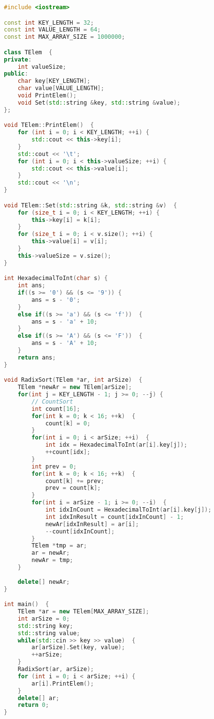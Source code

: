 \begin{lstlisting}[language=C++]
#include <iostream>

const int KEY_LENGTH = 32;
const int VALUE_LENGTH = 64;
const int MAX_ARRAY_SIZE = 1000000;

class TElem  {
private:
    int valueSize;
public:
    char key[KEY_LENGTH];
    char value[VALUE_LENGTH];
    void PrintElem();
    void Set(std::string &key, std::string &value);
};

void TElem::PrintElem()  {
    for (int i = 0; i < KEY_LENGTH; ++i) {
        std::cout << this->key[i];
    } 
    std::cout << '\t';
    for (int i = 0; i < this->valueSize; ++i) {
        std::cout << this->value[i];
    }
    std::cout << '\n';
}

void TElem::Set(std::string &k, std::string &v)  {
    for (size_t i = 0; i < KEY_LENGTH; ++i) {
        this->key[i] = k[i];
    }
    for (size_t i = 0; i < v.size(); ++i) {
        this->value[i] = v[i];
    }
    this->valueSize = v.size();
}

int HexadecimalToInt(char s) {
    int ans;
    if((s >= '0') && (s <= '9')) {
        ans = s - '0';
    }
    else if((s >= 'a') && (s <= 'f'))  {
        ans = s - 'a' + 10;
    }
    else if((s >= 'A') && (s <= 'F'))  {
        ans = s - 'A' + 10;
    }
    return ans;
}

void RadixSort(TElem *ar, int arSize)  {
    TElem *newAr = new TElem[arSize];
    for(int j = KEY_LENGTH - 1; j >= 0; --j) {
        // CountSort
        int count[16];
        for(int k = 0; k < 16; ++k)  {
            count[k] = 0;
        }
        for(int i = 0; i < arSize; ++i)  {
            int idx = HexadecimalToInt(ar[i].key[j]);
            ++count[idx];
        }
        int prev = 0;
        for(int k = 0; k < 16; ++k)  {
            count[k] += prev;
            prev = count[k];
        }
        for(int i = arSize - 1; i >= 0; --i)  {
            int idxInCount = HexadecimalToInt(ar[i].key[j]);
            int idxInResult = count[idxInCount] - 1;
            newAr[idxInResult] = ar[i];
            --count[idxInCount];
        }
        TElem *tmp = ar;
        ar = newAr;
        newAr = tmp;
    }
    
    delete[] newAr;
}

int main()  {
    TElem *ar = new TElem[MAX_ARRAY_SIZE];
    int arSize = 0;
    std::string key;
    std::string value;
    while(std::cin >> key >> value)  {
        ar[arSize].Set(key, value);
        ++arSize;
    }
    RadixSort(ar, arSize);
    for (int i = 0; i < arSize; ++i) {
        ar[i].PrintElem();
    }
    delete[] ar;
    return 0;
}	
\end{lstlisting}


